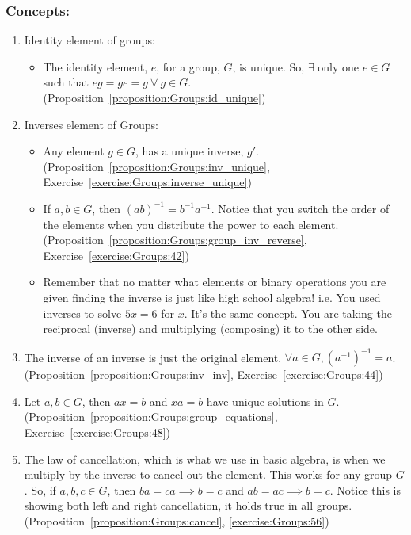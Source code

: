 \subsubsection*{Concepts:}
\begin{enumerate}
\item 
Identity element of groups: 
	\begin{itemize}
	\item
	The identity element, $e$, for a group, $G$, is unique. So, $\exists$ only one $e \in G$ such that $eg = ge = g\  \forall\  g \in G$. (Proposition~\ref{proposition:Groups:id_unique})
	\end{itemize}
\item
Inverses element of Groups:
	\begin{itemize}
	\item
	Any element $g \in G$, has a unique inverse, $g'$. (Proposition~\ref{proposition:Groups:inv_unique}, Exercise~\ref{exercise:Groups:inverse_unique})
	
	\item
	If $a, b \in G$, then $(ab)^{-1} = b^{-1}a^{-1}$. Notice that you switch the order of the elements when you distribute the power to each element. (Proposition~\ref{proposition:Groups:group_inv_reverse}, Exercise~\ref{exercise:Groups:42})

	\item
	Remember that no matter what elements or binary operations you are given finding the inverse is just like high school algebra! i.e. You used inverses to solve $5x = 6$ for $x$.  It's the same concept. You are taking the reciprocal (inverse) and multiplying (composing) it to the other side.
	\end{itemize}

\item
The inverse of an inverse is just the original element.  $\forall a \in G, (a^{-1})^{-1} = a$. (Proposition~\ref{proposition:Groups:inv_inv}, Exercise~\ref{exercise:Groups:44})

\item
Let $a, b \in G$, then $ax = b$ and $xa = b$ have unique solutions in $G$. (Proposition~\ref{proposition:Groups:group_equations}, Exercise~\ref{exercise:Groups:48})

\item
The law of cancellation, which is what we use in basic algebra, is when we multiply by the inverse to cancel out the element.  This works for any group $G$.  So, if $a, b, c \in G$, then $ba = ca \implies b = c$ and $ab = ac \implies b = c$. Notice this is showing both left and right cancellation, it holds true in all groups. (Proposition~\ref{proposition:Groups:cancel}, \ref{exercise:Groups:56})


\end{enumerate}
